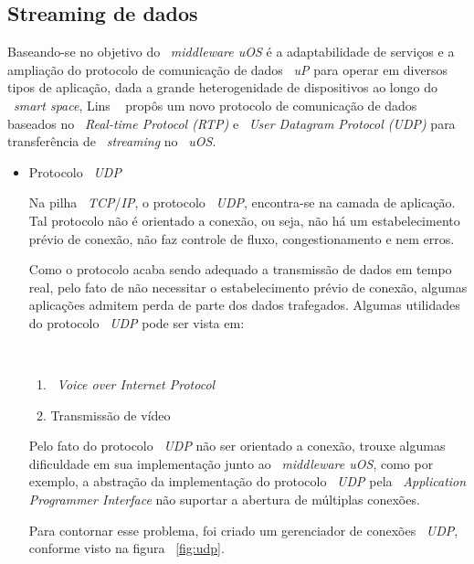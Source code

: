 \subsection{Streaming de dados}
\label{sec:streaming}

	Baseando-se no objetivo do ~\textit{middleware uOS} é a adaptabilidade de serviços e a ampliação do
	protocolo de comunicação de dados ~\textit{uP} para operar em diversos tipos de aplicação, dada a grande
	heterogenidade de dispositivos ao longo do ~\textit{smart space}, Lins ~\cite{lins} propôs um novo
	protocolo de comunicação de dados baseados no ~\textit{Real-time Protocol (RTP)} e ~\textit{User
	Datagram Protocol (UDP)} para transferência de ~\textit{streaming} no ~\textit{uOS}.

	\begin{itemize}
	  \item Protocolo ~\textit{UDP}
	  	
	  	Na pilha ~\textit{TCP}/\textit{IP}, o protocolo ~\textit{UDP}, encontra-se na camada de
	  	aplicação. Tal protocolo não é orientado a conexão, ou seja, não há um estabelecimento prévio de
	  	conexão, não faz controle de fluxo, congestionamento e nem erros.
	  	
	  	Como o protocolo acaba sendo adequado a transmissão de dados em tempo real, pelo fato de não
	  	necessitar o estabelecimento prévio de conexão, algumas aplicações admitem perda de parte dos
	  	dados trafegados. Algumas utilidades do protocolo ~\textit{UDP} pode ser vista em:
	  	
	  	~\begin{enumerate}
	  	  \item ~\textit{Voice over Internet Protocol}
	  	  \item Transmissão de vídeo
	  	\end{enumerate}
	  	
	  	Pelo fato do protocolo ~\textit{UDP} não ser orientado a conexão, trouxe algumas dificuldade em
	  	sua implementação junto ao ~\textit{middleware uOS}, como por exemplo, a abstração da
	  	implementação do protocolo ~\textit{UDP} pela ~\textit{Application Programmer Interface} não
	  	suportar a abertura de múltiplas conexões.
	  	 
	  	Para contornar esse problema, foi criado um gerenciador de conexões ~\textit{UDP}, conforme
	  	visto na figura ~\ref{fig:udp}.
	  

\end{itemize}

